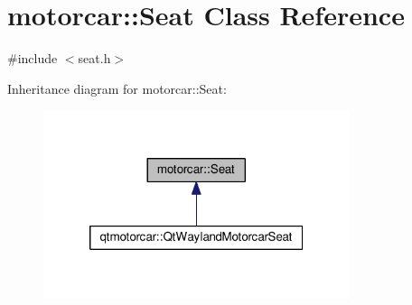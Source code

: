 \hypertarget{classmotorcar_1_1Seat}{\section{motorcar\-:\-:Seat Class Reference}
\label{classmotorcar_1_1Seat}
}


{\ttfamily \#include $<$seat.\-h$>$}



Inheritance diagram for motorcar\-:\-:Seat\-:
\nopagebreak
\begin{figure}[H]
\begin{center}
\leavevmode
\includegraphics[width=254pt]{classmotorcar_1_1Seat__inherit__graph}
\end{center}
\end{figure}
